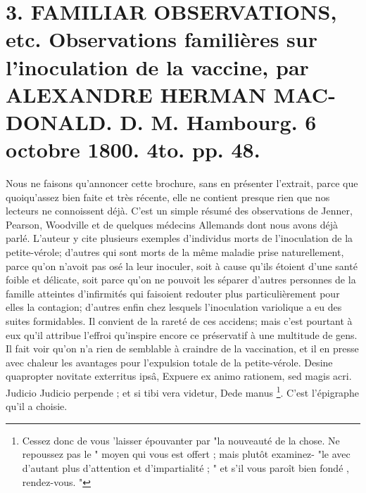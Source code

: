 \section{3. FAMILIAR OBSERVATIONS, etc. Observations familières sur l'inoculation de la vaccine, par ALEXANDRE HERMAN MAC-DONALD. D. M. Hambourg. 6 octobre 1800. 4to. pp. 48.}
Nous ne faisons qu'annoncer cette brochure, sans en présenter l'extrait, parce que quoiqu'assez\setcounter{page}{388} bien faite et très récente, elle ne contient presque rien que nos lecteurs ne connoissent déjà. C'est un simple résumé des observations de Jenner, Pearson, Woodville et de quelques médecins Allemands dont nous avons déjà parlé. L'auteur y cite plusieurs exemples d'individus morts de l'inoculation de la petite-vérole; d'autres qui sont morts de la même maladie prise naturellement, parce qu'on n'avoit pas osé la leur inoculer, soit à cause qu'ils étoient d'une santé foible et délicate, soit parce qu'on ne pouvoit les séparer d'autres personnes de la famille atteintes d'infirmités qui faisoient redouter plus particulièrement pour elles la contagion; d'autres enfin chez lesquels l'inoculation variolique a eu des suites formidables. Il convient de la rareté de ces accidens; mais c'est pourtant à eux qu'il attribue l'effroi qu'inspire encore ce préservatif à une multitude de gens. Il fait voir qu'on n'a rien de semblable à craindre de la vaccination, et il en presse avec chaleur les avantages pour l'expulsion totale de la petite-vérole.
Desine quapropter novitate exterritus ipsâ,
Expuere ex animo rationem, sed magis acri.
Judicio
\setcounter{page}{389}
Judicio perpende ; et si tibi vera videtur, Dede manus \footnote{Cessez donc de vous 'laisser épouvanter par "la nouveauté de la chose. Ne repoussez pas le " moyen qui vous est offert ; mais plutôt examinez- "le avec d'autant plus d'attention et d'impartialité ; " et s'il vous paroît bien fondé , rendez-vous. "}.
C'est l'épigraphe qu'il a choisie.
